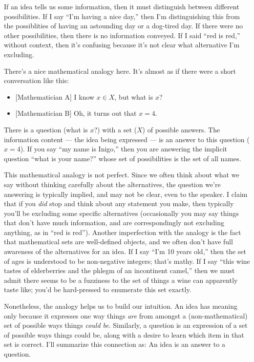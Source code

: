 \documentclass[11pt, oneside]{article}   	%
\newenvironment{answer}[1]
  {\renewcommand\theinnercustomthm{#1}\innercustomthm}
  {\endinnercustomthm}
\begin{document}
If an idea tells us some information, then it must distinguish between different
possibilities. If I say ``I'm having a nice day,'' then I'm distinguishing this
from the possiblities of having an astounding day or a dog-tired day.
If there were no other possibilities,
then there is no information conveyed. If I said
``red is red,'' without context, then it's confusing because it's not clear what
alternative I'm excluding.

There's a nice mathematical analogy here. It's almost as if there were a short
conversation like this:
\begin{itemize}
    \item{} [Mathematician A] I know $x\in X$, but what is $x$?
    \item{} [Mathematician B] Oh, it turns out that $x=4$.
\end{itemize}
There is a question (what is $x$?) with a set ($X$) of possible answers. The
information content --- the idea being expressed ---
is an answer to this question ($x=4$). If you say ``my name is Inigo,''
then you are answering the implicit question ``what is your name?'' whose set of
possibilities is the set of all names.

This mathematical analogy is not perfect.
Since we often think about what we say without thinking carefully about the
alternatives, the question we're answering
is typically implied, and may not be clear, even to
the speaker. I claim that if you {\em did} stop and think about any statement
you
make, then typically you'll be excluding some specific alternatives
(occasionally you may say things that don't have much information, and are
correspondingly not excluding anything, as in ``red is red'').
Another imperfection with the analogy is the fact that mathematical
sets are well-defined objects, and we often don't have full awareness of the
alternatives for an idea.
If I say ``I'm 10 years old,'' then the set of ages is understood
to be non-negative integers; that's mathy. If I say ``this wine tastes of
elderberries and the phlegm of an incontinent camel,'' then we must admit there
seems to be a fuzziness to the set of things a wine can apparently taste like;
you'd be hard-pressed to enumerate this set exactly.

Nonetheless, the analogy helps us to build our intuition.
An idea has meaning only because it expresses one way things
{\em are} from amongst a
(non-mathematical) set of possible ways things {\em could be}.
Similarly, a question is an expression of a set of possible ways things could
be, along with a desire to learn which item in that set is correct.
I'll summarize this
connection as:
\begin{answer}{4}
    An idea is an answer to a question.
\end{answer}
\end{document}
